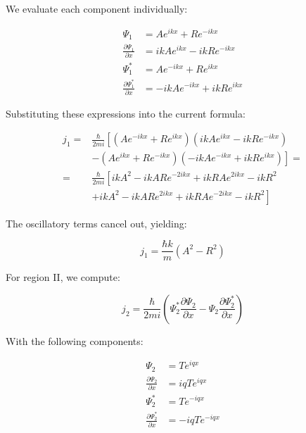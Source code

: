 \documentclass[italian]{HKNdocument}
\begin{document}
We evaluate each component individually:

\begin{align}
\Psi_{1} & =A e^{i k x}+R e^{-i k x} \\
\frac{\partial \Psi_{1}}{\partial x} & =i k A e^{i k x}-i k R e^{-i k x} \\
\Psi_{1}^{*} & =A e^{-i k x}+R e^{i k x}  \label{eq:6.20}\\
\frac{\partial \Psi_{1}^{*}}{\partial x} & =-i k A e^{-i k x}+i k R e^{i k x}
\end{align}

Substituting these expressions into the current formula:

\begin{align}
j_{1}= & \frac{\hbar}{2 m i}\left[\left(A e^{-i k x}+R e^{i k x}\right)\left(i k A e^{i k x}-i k R e^{-i k x}\right)\right. \\
& \left.-\left(A e^{i k x}+R e^{-i k x}\right)\left(-i k A e^{-i k x}+i k R e^{i k x}\right)\right]= \\
= & \frac{\hbar}{2 m i}\left[i k A^{2}-i k A R e^{-2 i k x}+i k R A e^{2 i k x}-i k R^{2}\right.  \label{eq:6.21}\\
& \left.+i k A^{2}-i k A R e^{2 i k x}+i k R A e^{-2 i k x}-i k R^{2}\right]
\end{align}

The oscillatory terms cancel out, yielding:

\begin{equation}
j_{1}=\frac{\hbar k}{m}\left(A^{2}-R^{2}\right) \label{eq:6.22}
\end{equation}

For region II, we compute:

\begin{equation}
j_{2}=\frac{\hbar}{2 m i}\left(\Psi_{2}^{*} \frac{\partial \Psi_{2}}{\partial x}-\Psi_{2} \frac{\partial \Psi_{2}^{*}}{\partial x}\right) \label{eq:6.23}
\end{equation}

With the following components:

\begin{align}
\Psi_{2} & =T e^{i q x} \\
\frac{\partial \Psi_{2}}{\partial x} & =i q T e^{i q x}  \label{eq:6.24}\\
\Psi_{2}^{*} & =T e^{-i q x} \\
\frac{\partial \Psi_{2}^{*}}{\partial x} & =-i q T e^{-i q x}
\end{align}
\end{document}
